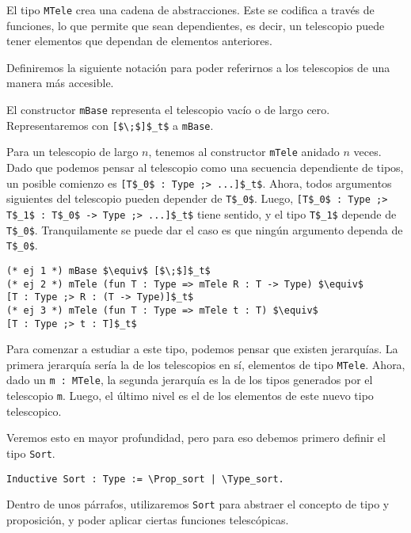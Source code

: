 El tipo \lstinline{MTele} crea una cadena de abstracciones.
Este se codifica a través de funciones, lo que permite que sean dependientes, es decir, un telescopio puede tener elementos que dependan de elementos anteriores.

Definiremos la siguiente notación para poder referirnos a los telescopios de una manera más accesible.

El constructor \lstinline{mBase} representa el telescopio vacío o de largo cero. Representaremos con \lstinline{[$\;$]$_t$} a \lstinline{mBase}.

Para un telescopio de largo $n$, tenemos al constructor \lstinline{mTele} anidado $n$ veces. Dado que podemos pensar al telescopio como una secuencia dependiente de tipos, un posible comienzo es \lstinline{[T$_0$ : Type ;> ...]$_t$}. Ahora, todos argumentos siguientes del telescopio pueden depender de \lstinline{T$_0$}. Luego, \lstinline{[T$_0$ : Type ;> T$_1$ : T$_0$ -> Type ;> ...]$_t$} tiene sentido, y el tipo \lstinline{T$_1$} depende de \lstinline{T$_0$}. Tranquilamente se puede dar el caso es que ningún argumento dependa de \lstinline{T$_0$}.

\begin{lstlisting}[frame=tb,caption={Notación de telescopios},label=lst:not_tele]
(* ej 1 *) mBase $\equiv$ [$\;$]$_t$
(* ej 2 *) mTele (fun T : Type => mTele R : T -> Type) $\equiv$
[T : Type ;> R : (T -> Type)]$_t$
(* ej 3 *) mTele (fun T : Type => mTele t : T) $\equiv$
[T : Type ;> t : T]$_t$
\end{lstlisting}

Para comenzar a estudiar a este tipo, podemos pensar que existen jerarquías.
La primera jerarquía sería la de los telescopios en sí, elementos de tipo \lstinline{MTele}.
Ahora, dado un \lstinline{m : MTele}, la segunda jerarquía es la de los tipos generados por el telescopio \lstinline{m}.
Luego, el último nivel es el de los elementos de este nuevo tipo telescopico.

Veremos esto en mayor profundidad, pero para eso debemos primero definir el tipo \lstinline{Sort}.

\begin{lstlisting}[frame=tb,caption={Definición de \lstinline{Sort}},label=lst:Sort]
Inductive Sort : Type := \Prop_sort | \Type_sort.
\end{lstlisting}

Dentro de unos párrafos, utilizaremos \lstinline{Sort} para abstraer el concepto de tipo y proposición, y poder aplicar ciertas funciones telescópicas.

